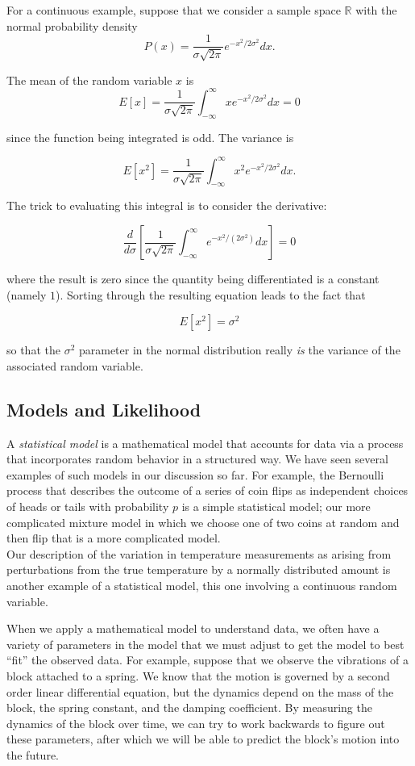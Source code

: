 \documentclass[
]{article}
\begin{document}
For a continuous example, suppose that we consider a sample space
\(\mathbb{R}\) with the normal probability density \[
P(x) = \frac{1}{\sigma\sqrt{2\pi}}e^{-x^2/2\sigma^2}dx.
\]

The mean of the random variable \(x\) is \[
E[x] =\frac{1}{\sigma\sqrt{2\pi}}\int_{-\infty}^{\infty} xe^{-x^2/2\sigma^2}dx=0
\]

since the function being integrated is odd. The variance is

\[
E[x^2] = \frac{1}{\sigma\sqrt{2\pi}}\int_{-\infty}^{\infty} x^2e^{-x^2/2\sigma^2}dx.
\]

The trick to evaluating this integral is to consider the derivative:

\[
\frac{d}{d\sigma}\left[\frac{1}{\sigma\sqrt{2\pi}}\int_{-\infty}^{\infty}e^{-x^2/(2\sigma^2)}dx\right]=0
\]

where the result is zero since the quantity being differentiated is a
constant (namely \(1\)). Sorting through the resulting equation leads to
the fact that

\[
E[x^2]=\sigma^2
\]

so that the \(\sigma^2\) parameter in the normal distribution really
\emph{is} the variance of the associated random variable.

\hypertarget{models-and-likelihood}{%
\subsection{Models and Likelihood}\label{models-and-likelihood}}

A \emph{statistical model} is a mathematical model that accounts for
data via a process that incorporates random behavior in a structured
way. We have seen several examples of such models in our discussion so
far. For example, the Bernoulli process that describes the outcome of a
series of coin flips as independent choices of heads or tails with
probability \(p\) is a simple statistical model; our more complicated
mixture model in which we choose one of two coins at random and then
flip that is a more complicated model.\\
Our description of the variation in temperature measurements as arising
from perturbations from the true temperature by a normally distributed
amount is another example of a statistical model, this one involving a
continuous random variable.

When we apply a mathematical model to understand data, we often have a
variety of parameters in the model that we must adjust to get the model
to best ``fit'' the observed data. For example, suppose that we observe
the vibrations of a block attached to a spring. We know that the motion
is governed by a second order linear differential equation, but the
dynamics depend on the mass of the block, the spring constant, and the
damping coefficient. By measuring the dynamics of the block over time,
we can try to work backwards to figure out these parameters, after which
we will be able to predict the block's motion into the future.
\end{document}
